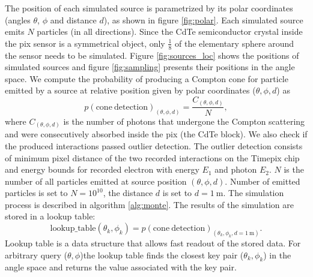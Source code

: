 The position of each simulated source is parametrized by its polar coordinates (angles $\theta$, $\phi$ and distance $d$), as shown in figure \ref{fig:polar}.
Each simulated source emits $N$ particles (in all directions).
Since the \ac{CdTe} semiconductor crystal inside the \ac{pix} sensor is a symmetrical object, only $\frac{1}{8}$ of the elementary sphere around the sensor needs to be simulated.
Figure \ref{fig:sources_loc} shows the positions of simulated sources and figure \ref{fig:sampling} presents their positions in the angle space.
We compute the probability of producing a Compton cone for particle emitted by a source at relative position given by polar coordinates ($\theta, \phi, d$) as
\begin{equation}
  p(\mathrm{cone\ detection})_{(\theta, \phi, d)} = \frac{C_{(\theta, \phi, d)}}{N},
\end{equation} 
where $C_{(\theta, \phi, d)}$ is the number of photons that undergone the Compton scattering and were consecutively absorbed inside the \ac{pix} (the \ac{CdTe} block). 
We also check if the produced interactions passed outlier detection. %
The outlier detection consists of minimum pixel distance of the two recorded interactions on the Timepix chip and energy bounds for recorded electron with energy $E_{1}$ and photon $E_{2}$. 
$N$ is the number of all particles emitted at source position $(\theta, \phi, d)$. 
Number of emitted particles is set to $N = 10^{10}$, the distance $d$ is set to $d = \SI{1}\meter$.
The simulation process is described in algorithm \ref{alg:monte}. 
The results of the simulation are stored in a lookup table:
\begin{equation}
  \mathrm{lookup\_table}(\theta_{k}, \phi_{k}) = p(\mathrm{cone\ detection})_{(\theta_{k}, \phi_{k}, d = \SI{1}\meter)}. 
\end{equation}
Lookup table is a data structure that allows fast readout of the stored data.
For arbitrary query ($\theta, \phi$)the lookup table finds the closest key pair ($\theta_{k}, \phi_{k}$) in the angle space and returns the value associated with the key pair.%


